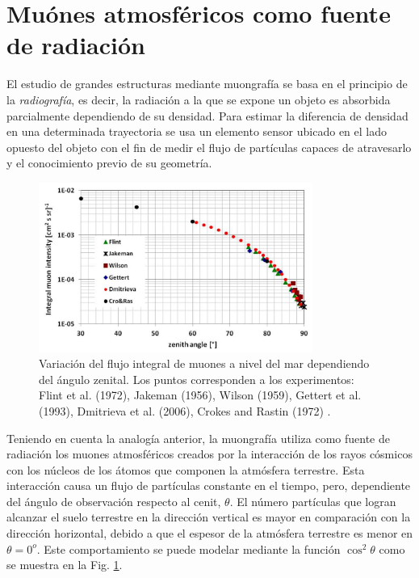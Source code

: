 \section{Muónes atmosféricos como fuente de radiación}


El estudio de grandes estructuras mediante muongrafía se basa en el principio de la \textit{radiografía}, es decir, la radiación a la que se expone un objeto es absorbida parcialmente dependiendo de su densidad. Para estimar la diferencia de densidad en una determinada trayectoria se usa un elemento sensor ubicado en el lado opuesto del objeto con el fin de medir el flujo de partículas capaces de atravesarlo y el conocimiento previo de su geometría. 

\begin{figure}[h!]
\begin{center}
\includegraphics[width=0.8\textwidth]{Figures/Muon_flux}
\caption[Variación del flujo integral de muones a nivel del mar dependiendo del ángulo zenital]{Variación del flujo integral de muones a nivel del mar dependiendo del ángulo zenital. Los puntos corresponden a los experimentos: Flint et al. (1972), Jakeman (1956), Wilson (1959), Gettert et al. (1993), Dmitrieva et al. (2006), Crokes and Rastin (1972) \cite{Cecchini2012}.}
\label{Muon_flux}
\end{center}
\end{figure}

Teniendo en cuenta la analogía anterior, la muongrafía utiliza como fuente de radiación los muones atmosféricos creados por la interacción de los rayos cósmicos con los núcleos de los átomos que componen la atmósfera terrestre. Esta interacción causa un flujo de partículas constante en el tiempo, pero, dependiente del ángulo de observación respecto al cenit, $\theta$. El número partículas que logran alcanzar el suelo terrestre en la dirección vertical es mayor en comparación con la dirección horizontal, debido a que el espesor de la atmósfera terrestre es menor en $\theta=0^o$. Este comportamiento se puede modelar mediante la función $\cos^2 \theta$ como se muestra en la Fig. \ref{Muon_flux}.

